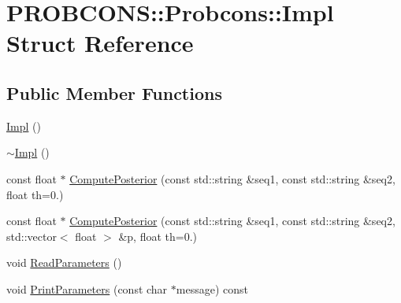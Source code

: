 \hypertarget{struct_p_r_o_b_c_o_n_s_1_1_probcons_1_1_impl}{\section{P\+R\+O\+B\+C\+O\+N\+S\+:\+:Probcons\+:\+:Impl Struct Reference}
\label{struct_p_r_o_b_c_o_n_s_1_1_probcons_1_1_impl}
}
\subsection*{Public Member Functions}
\begin{DoxyCompactItemize}
\item 
\hyperlink{struct_p_r_o_b_c_o_n_s_1_1_probcons_1_1_impl_a4af4223b7795e5be4d06b139ea5bd90f}{Impl} ()
\item 
\hyperlink{struct_p_r_o_b_c_o_n_s_1_1_probcons_1_1_impl_aa000e761a812f75c2350a2a03ca5b602}{$\sim$\+Impl} ()
\item 
const float $\ast$ \hyperlink{struct_p_r_o_b_c_o_n_s_1_1_probcons_1_1_impl_ab9c0fda5290d44136f5d6f3c03e04e6d}{Compute\+Posterior} (const std\+::string \&seq1, const std\+::string \&seq2, float th=0.)
\item 
const float $\ast$ \hyperlink{struct_p_r_o_b_c_o_n_s_1_1_probcons_1_1_impl_a1fdbb42452bbb35617f4c2c77ec68bfa}{Compute\+Posterior} (const std\+::string \&seq1, const std\+::string \&seq2, std\+::vector$<$ float $>$ \&p, float th=0.)
\item 
void \hyperlink{struct_p_r_o_b_c_o_n_s_1_1_probcons_1_1_impl_a22d56659c4c650ba5c992984465c1d26}{Read\+Parameters} ()
\item 
void \hyperlink{struct_p_r_o_b_c_o_n_s_1_1_probcons_1_1_impl_aacc283755a37d7205dd4a34d0d62fdb2}{Print\+Parameters} (const char $\ast$message) const 
\end{DoxyCompactItemize}


